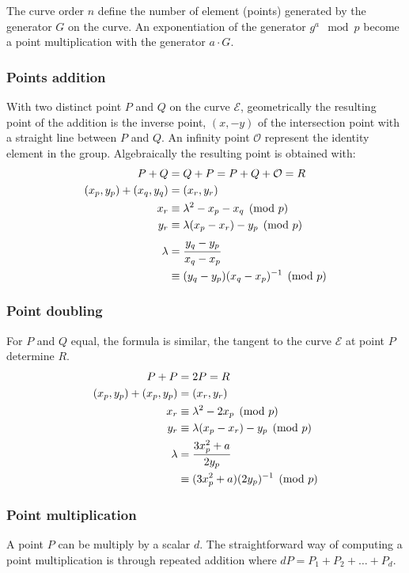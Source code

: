 The curve order $n$ define the number of element (points) generated by the generator
$G$ on the curve. An exponentiation of the generator $g^a \mod p$ become a point multiplication
with the generator $a \cdot G$.

\subsubsection{Points addition}
With two distinct point $P$ and $Q$ on the curve $\mathcal{E}$, geometrically the resulting point of the
addition is the inverse point, $(x, -y)$ of the intersection point with a straight
line between $P$ and $Q$. An infinity point $\mathcal{O}$ represent the identity element in the group.
Algebraically the resulting point is obtained with:
\begin{equation}
\begin{split}
  P + Q &= Q + P = P + Q + \mathcal{O} = R \\
  (x_p, y_p) + (x_q, y_q) &= (x_r, y_r) \\
  x_r &\equiv \lambda^2 - x_p - x_q \pmod p \\
  y_r &\equiv \lambda(x_p - x_r) - y_p \pmod p  \\
  \lambda &= \cfrac{y_q - y_p}{x_q - x_p} \\
          &\equiv (y_q - y_p)(x_q - x_p)^{-1} \pmod p
\end{split}
\end{equation}

\subsubsection{Point doubling}
For $P$ and $Q$ equal, the formula is similar, the tangent to the curve $\mathcal{E}$ at
point $P$ determine $R$.
\begin{equation}
\begin{split}
  P + P &= 2P = R \\
  (x_p, y_p) + (x_p, y_p) &= (x_r, y_r) \\
  x_r &\equiv \lambda^2 - 2x_p \pmod p \\
  y_r &\equiv \lambda(x_p - x_r) - y_p \pmod p  \\
  \lambda &= \cfrac{3x_p^2 + a}{2y_p} \\
          &\equiv (3x_p^2 + a)(2y_p)^{-1} \pmod p
\end{split}
\end{equation}

\subsubsection{Point multiplication}
A point $P$ can be multiply by a scalar $d$. The straightforward way of computing
a point multiplication is through repeated addition where $dP = P_1 + P_2 + \dots + P_d$.

